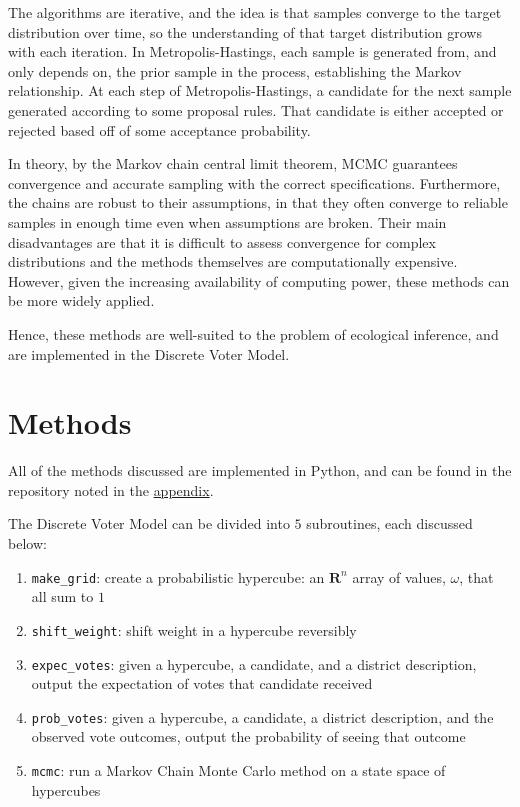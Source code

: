 \documentclass[fleqn,10pt]{style}
\begin{document}
The algorithms are iterative, and the idea is that samples converge to the target distribution over time, so the understanding of that target distribution grows with each iteration. In Metropolis-Hastings, each sample is generated from, and only depends on, the prior sample in the process, establishing the Markov relationship. At each step of Metropolis-Hastings, a candidate for the next sample generated according to some proposal rules. That candidate is either accepted or rejected based off of some acceptance probability.

In theory, by the Markov chain central limit theorem, MCMC guarantees convergence and accurate sampling with the correct specifications. Furthermore, the chains are robust to their assumptions, in that they often converge to reliable samples in enough time even when assumptions are broken. Their main disadvantages are that it is difficult to assess convergence for complex distributions and the methods themselves are computationally expensive. However, given the increasing availability of computing power, these methods can be more widely applied.

Hence, these methods are well-suited to the problem of ecological inference, and are implemented in the Discrete Voter Model.


\newpage
\section{Methods}

All of the methods discussed are implemented in Python, and can be found in the repository noted in the \hyperref[sec:appendix]{appendix}.

The Discrete Voter Model can be divided into $5$ subroutines, each discussed below:

\begin{enumerate}[noitemsep]
  \item \texttt{make\_grid}: create a probabilistic hypercube: an $\mathbf{R}^n$ array of values, $\omega$, that all sum to $1$
  \item \texttt{shift\_weight}: shift weight in a hypercube reversibly
  \item \texttt{expec\_votes}: given a hypercube, a candidate, and a district description, output the expectation of votes that candidate received
  \item \texttt{prob\_votes}: given a hypercube, a candidate, a district description, and the observed vote outcomes, output the probability of seeing that outcome
  \item \texttt{mcmc}: run a Markov Chain Monte Carlo method on a state space of hypercubes
\end{enumerate}
\end{document}
